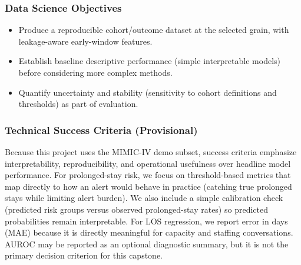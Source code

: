 \documentclass[12pt]{article}
\begin{document}
\subsubsection*{Data Science Objectives}
\begin{itemize}[leftmargin=1.5em]
    \item Produce a reproducible cohort/outcome dataset at the selected grain, with leakage-aware early-window features.
    \item Establish baseline descriptive performance (simple interpretable models) before considering more complex methods.
    \item Quantify uncertainty and stability (sensitivity to cohort definitions and thresholds) as part of evaluation.
\end{itemize}



\subsubsection*{Technical Success Criteria (Provisional)}
Because this project uses the MIMIC-IV demo subset, success criteria emphasize interpretability, reproducibility, and operational usefulness over headline model performance. For prolonged-stay risk, we focus on threshold-based metrics that map directly to how an alert would behave in practice (catching true prolonged stays while limiting alert burden). We also include a simple calibration check (predicted risk groups versus observed prolonged-stay rates) so predicted probabilities remain interpretable. For LOS regression, we report error in days (MAE) because it is directly meaningful for capacity and staffing conversations. AUROC may be reported as an optional diagnostic summary, but it is not the primary decision criterion for this capstone.
\end{document}
